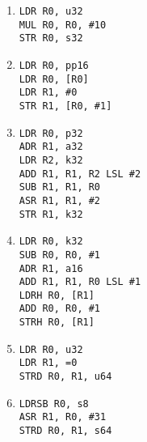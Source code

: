\documentclass{article}
\begin{document}
\begin{enumerate}
\begin{multicols}{2}
\begin{enumerate}
            \item
                \texttt{LDR R0, u32}    \\
                \texttt{MUL R0, R0, \#10}   \\
                \texttt{STR R0, s32}    \\

            \item
                \texttt{LDR R0, pp16}   \\
                \texttt{LDR R0, [R0]}   \\
                \texttt{LDR R1, \#0}    \\
                \texttt{STR R1, [R0, \#1]}   \\

            \item
                \texttt{LDR R0, p32}    \\
                \texttt{ADR R1, a32}    \\
                \texttt{LDR R2, k32}    \\
                \texttt{ADD R1, R1, R2 LSL \#2}  \\
                \texttt{SUB R1, R1, R0} \\
                \texttt{ASR R1, R1, \#2}    \\
                \texttt{STR R1, k32}    \\

            \item
                \texttt{LDR R0, k32}    \\
                \texttt{SUB R0, R0, \#1}\\
                \texttt{ADR R1, a16}    \\
                \texttt{ADD R1, R1, R0 LSL \#1}   \\
                \texttt{LDRH R0, [R1]}   \\
                \texttt{ADD R0, R0, \#1}\\
                \texttt{STRH R0, [R1]}  \\

            \item
                \texttt{LDR R0, u32}  \\
                \texttt{LDR R1, =0}  \\
                \texttt{STRD R0, R1, u64}  \\

            \item
                \texttt{LDRSB R0, s8}  \\
                \texttt{ASR R1, R0, \#31}  \\
                \texttt{STRD R0, R1, s64}   \\


\end{enumerate}
\end{multicols}
\end{enumerate}
\end{document}
